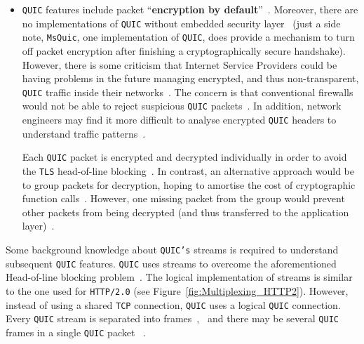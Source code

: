 \documentclass[12pt,a4paper,twoside,openright]{report}
\begin{document}
\begin{itemize}
 
  \item \texttt{QUIC} features include packet \enquote{\textbf{encryption by default}}~\cite{the-road-to-quic}.
  Moreover, there are no implementations of \texttt{QUIC} without embedded security layer~\cite{head-of-line-blocking-in-quic-and-http-3-the-details}
  (just a side note, \texttt{MsQuic}, one implementation of \texttt{QUIC}, does provide a mechanism to turn off packet encryption after finishing a cryptographically secure handshake).
  However, there is some criticism that Internet Service Providers could be having problems in the future managing encrypted, and thus non-transparent, \texttt{QUIC} traffic inside their networks~\cite{why-is-googles-quic-leaving-network-operators-in-the-dark}.
  The concern is that conventional firewalls would not be able to reject suspicious \texttt{QUIC} packets~\cite{quic-the-internet-transport-protocol-based-on-udp}.
  In addition, network engineers may find it more difficult to analyse encrypted \texttt{QUIC} headers to understand traffic patterns~\cite{2017-12-18-transport-header-encryption}.
  
  Each \texttt{QUIC} packet is encrypted and decrypted individually in order to avoid the \texttt{TLS} head-of-line blocking~\cite{head-of-line-blocking-in-quic-and-http-3-the-details}.
  In contrast, an alternative approach would be to group packets for decryption, hoping to amortise the cost of cryptographic function calls~\cite{head-of-line-blocking-in-quic-and-http-3-the-details, optimizing-tls-record-size-and-buffering-latency}.
  However, one missing packet from the group would prevent other packets from being decrypted (and thus transferred to the application layer)~\cite{head-of-line-blocking-in-quic-and-http-3-the-details}.


  
  \end{itemize}
  Some background knowledge about \texttt{QUIC's} streams is required to understand subsequent \texttt{QUIC} features.
  \texttt{QUIC} uses streams to overcome the aforementioned Head-of-line blocking problem~\cite{UnderstandQUIC}.
  The logical implementation of streams is similar to the one used for \texttt{HTTP/2.0} (see Figure~\ref{fig:Multiplexing_HTTP2}).
  However, instead of using a shared \texttt{TCP} connection, \texttt{QUIC} uses a logical \texttt{QUIC} connection.
  Every \texttt{QUIC} stream is separated into frames~\cite{UnderstandQUIC},~\cite[Chapter~2.1]{ ietf-quic-transport-draft-32} and there may be several \texttt{QUIC} frames in a single \texttt{QUIC} packet ~\cite[Chapter~1]{ ietf-quic-transport-draft-32}.
\end{document}
